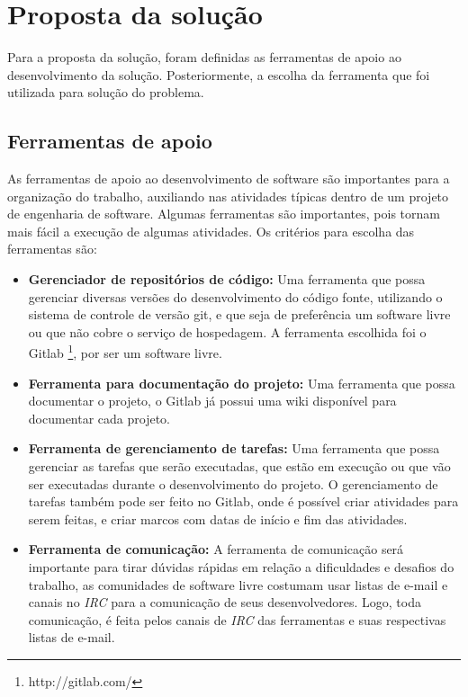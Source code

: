 \section{Proposta da solução}
\label{section:construcao}

Para a proposta da solução, foram definidas as ferramentas
de apoio ao desenvolvimento da solução. Posteriormente, a escolha da ferramenta
que foi utilizada para solução do problema.

\subsection{Ferramentas de apoio}

As ferramentas de apoio ao desenvolvimento de software são importantes para a
organização do trabalho, auxiliando nas atividades típicas dentro de um projeto
de engenharia de software. Algumas ferramentas são importantes, pois tornam mais fácil
a execução de algumas atividades. Os critérios para escolha das ferramentas são:

\begin{itemize}
  \item \textbf{Gerenciador de repositórios de código:} Uma ferramenta que
  possa gerenciar diversas versões do desenvolvimento do código fonte, utilizando
  o sistema de controle de versão git, e que seja de preferência um software livre
  ou que não cobre o serviço de hospedagem. A ferramenta escolhida foi o Gitlab 
  \footnote{http://gitlab.com/}, por ser um software livre.
  \item \textbf{Ferramenta para documentação do projeto:} Uma ferramenta que possa
  documentar o projeto, o Gitlab já possui uma wiki disponível para documentar 
  cada projeto.
  \item \textbf{Ferramenta de gerenciamento de tarefas:} Uma ferramenta que possa
  gerenciar as tarefas que serão executadas, que estão em execução ou que vão ser executadas
  durante o desenvolvimento do projeto. O gerenciamento de tarefas também pode ser
  feito no Gitlab, onde é possível criar atividades para serem feitas, e criar marcos
  com datas de início e fim das atividades.
  \item \textbf{Ferramenta de comunicação:} A ferramenta de comunicação será
  importante para tirar dúvidas rápidas em relação a dificuldades e desafios do trabalho, 
  as
  comunidades de software livre costumam usar listas de e-mail e canais no \textit{IRC}
  para a comunicação de seus desenvolvedores. Logo, toda comunicação, é feita
  pelos canais de \textit{IRC} das ferramentas e suas respectivas listas de e-mail.
\end{itemize}

